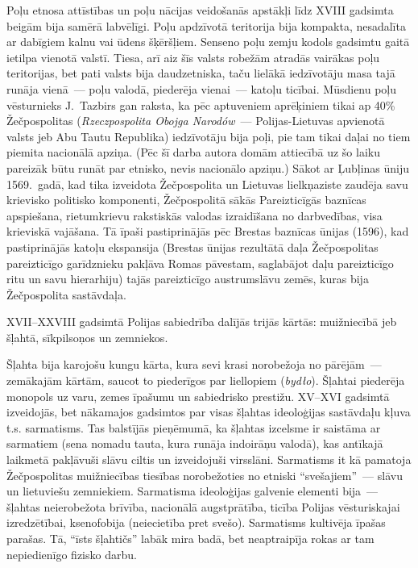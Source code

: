 \documentclass[twoside,a5paper,12pt,fleqn,openany]{extbook}
\newcommand{\pltxti}[1]{\textit{\textpolish{#1}}}
\begin{document}
Poļu etnosa attīstības un poļu nācijas veidošanās apstākļi līdz XVIII gadsimta beigām bija samērā labvēlīgi. Poļu apdzīvotā teritorija bija kompakta, nesadalīta ar dabīgiem kalnu vai ūdens šķēršļiem. Senseno poļu zemju kodols gadsimtu gaitā ietilpa vienotā valstī. Tiesa, arī aiz šīs valsts robežām atradās vairākas poļu teritorijas, bet pati valsts bija daudzetniska, taču lielākā iedzīvotāju masa tajā runāja vienā~--- poļu valodā, piederēja vienai~--- katoļu ticībai. Mūsdienu poļu vēsturnieks J.~Tazbirs gan raksta, ka pēc aptuveniem aprēķiniem tikai ap 40\% Žečpospolitas (\pltxti{Rzeczpospolita Obojga Narodów}~--- Polijas-Lietuvas apvienotā valsts jeb Abu Tautu Republika) iedzīvotāju bija poļi, pie tam tikai daļai no tiem piemita nacionālā apziņa. (Pēc šī darba autora domām attiecībā uz šo laiku pareizāk būtu runāt par etnisko, nevis nacionālo apziņu.) Sākot ar Ļubļinas ūniju 1569.~gadā, kad tika izveidota Žečpospolita un Lietuvas lielkņaziste zaudēja savu krievisko politisko komponenti, Žečpospolitā sākās Pareizticīgās baznīcas apspiešana, rietumkrievu rakstiskās valodas izraidīšana no darbvedības, visa krieviskā vajāšana. Tā īpaši pastiprinājās pēc Brestas baznīcas ūnijas (1596), kad pastiprinājās katoļu ekspansija (Brestas ūnijas rezultātā daļa Žečpospolitas pareizticīgo garīdznieku pakļāva Romas pāvestam, saglabājot daļu pareizticīgo ritu un savu hierarhiju) tajās pareizticīgo austrumslāvu zemēs, kuras bija Žečpospolita sastāvdaļa.

XVII--XXVIII gadsimtā Polijas sabiedrība dalījās trijās kārtās: muižniecībā jeb šļahtā, sīkpilsoņos un zemniekos.

Šļahta bija karojošu kungu kārta, kura sevi krasi norobežoja no pārējām~--- zemākajām kārtām, saucot to piederīgos par liellopiem (\pltxti{bydło}). Šļahtai piederēja monopols uz varu, zemes īpašumu un sabiedrisko prestižu. XV--XVI gadsimtā izveidojās, bet nākamajos gadsimtos par visas šļahtas ideoloģijas sastāvdaļu kļuva t.s. sarmatisms. Tas balstījās pieņēmumā, ka šļahtas izcelsme ir saistāma ar sarmatiem (sena nomadu tauta, kura runāja indoirāņu valodā), kas antīkajā laikmetā pakļāvuši slāvu ciltis un izveidojuši virsslāni. Sarmatisms it kā pamatoja Žečpospolitas muižniecības tiesības norobežoties no etniski ``svešajiem''~--- slāvu un lietuviešu zemniekiem. Sarmatisma ideoloģijas galvenie elementi bija~--- šļahtas neierobežota brīvība, nacionālā augstprātība, ticība Polijas vēsturiskajai izredzētībai, ksenofobija (neiecietība pret svešo). Sarmatisms kultivēja īpašas parašas. Tā, ``īsts šļahtičs'' labāk mira badā, bet neaptraipīja rokas ar tam nepiedienīgo fizisko darbu.
\end{document}
